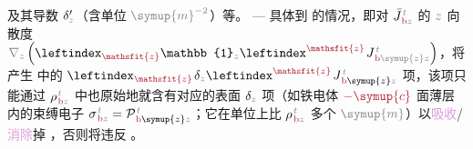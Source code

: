 及其导数 $\delta'_{\mathcolor{gray}{z}}$（含单位 $\mathcolor{gray}{\symup{m}^{-2}}$）等。 ---  具体到  的情况，即对 $\bar{J}^{\;\!\mathcolor{gray}{t}}_{\;\!\textcolor{Maroon}{\text{b}}\mathcolor{gray}{z}}$ 的 $\mathcolor{gray}{z}$ 向散度 $\mathcolor{gray}{\nabla_z} \left( \leftindex_{\textcolor{Maroon}{\mathsfit{z}}} {\mathbb{1}}_{\mathcolor{gray}{z}} \leftindex^{\textcolor{Maroon}{\mathsfit{z}}} \;\! J^{\;\!\mathcolor{gray}{t}}_{\;\!\textcolor{Maroon}{\text{b}} \mathcolor{gray}{\symup{z}} \mathcolor{gray}{z}} \right)$，将产生  中的 $\leftindex_{\textcolor{Maroon}{\mathsfit{z}}} \;\! \delta_{\mathcolor{gray}{z}} \leftindex^{\textcolor{Maroon}{\mathsfit{z}}} \;\! J^{\;\!\mathcolor{gray}{t}}_{\;\!\textcolor{Maroon}{\text{b}} \symup{z} \mathcolor{gray}{z}}$ 项，该项只能通过 ${\rho}^{\;\!\mathcolor{gray}{t}}_{\;\!\textcolor{Maroon}{\text{b}}\mathcolor{gray}{z}}$ 中也原始地就含有对应的表面 $\delta_{\mathcolor{gray}{z}}$ 项（如铁电体 $\textcolor{Maroon}{-\symup{c}}$ 面薄层内的束缚电子 ${\sigma}^{\;\!\mathcolor{gray}{t}}_{\;\!\textcolor{Maroon}{\text{b}}\mathcolor{gray}{z}} = {\mathcal{P}}^{\;\!\mathcolor{gray}{t}}_{\;\!\textcolor{Maroon}{\text{b}} \symup{z} \mathcolor{gray}{z}}$；它在单位上比 ${\rho}^{\;\!\mathcolor{gray}{t}}_{\;\!\textcolor{Maroon}{\text{b}}\mathcolor{gray}{z}}$ 多个 $\mathcolor{gray}{\symup{m}}$）以\textcolor{Plum}{吸收}/\textcolor{Plum}{消除}掉 \cite{grahamMultipoleSolutionMacroscopic2000}，否则将违反 。

